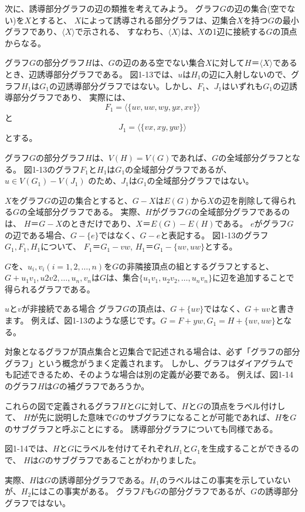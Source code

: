 
次に、誘導部分グラフの辺の類推を考えてみよう。
グラフ$G$の辺の集合(空でない)を$X$とすると、
$X$によって誘導される部分グラフは、辺集合$X$を持つ$G$の最小グラフであり、$\langle X\rangle $で示される、
すなわち、$\langle X\rangle $は、$X$の1辺に接続する$G$の頂点からなる。

グラフ$G$の部分グラフ$H$は、$G$の辺のある空でない集合$X$に対して$H＝\langle X\rangle $であるとき、辺誘導部分グラフである。
図1-13では、$u$は$H_1$の辺に入射しないので、グラフ$H_1$は$G_1$の辺誘導部分グラフではない。しかし、$F_1$、$J_1$はいずれも$G_1$の辺誘導部分グラフであり、
実際には、
$$F_1 = \langle \{uv, uw, wy, yx, xv\}\rangle $$
と
$$J_1 = \langle \{vx, xy, yw\} \rangle$$
とする。


グラフ$G$の部分グラフ$H$は、$V(H)=V(G)$であれば、$G$の全域部分グラフとなる。
図1-13のグラフ$F_1$と$H_1$は$G_1$の全域部分グラフであるが、
$u \in V(G_1) - V(J_1)$ のため、$J_1$は$G_1$の全域部分グラフではない。 

$X$をグラフ$G$の辺の集合とすると、$G - X$は$E(G)$から$X$の辺を削除して得られる$G$の全域部分グラフである。
実際、$H$がグラフ$G$の全域部分グラフであるのは、
$H＝G- X$のときだけであり、$X＝E(G)-E(H)$である。
$e$がグラフ$G$の辺である場合、$G-\{e\}$ではなく、$G-e$と表記する。
図1-13のグラフ$G_1, F_1, H_1$について、
$F_1＝G_1 - vw$, $H_1＝G_1 - \{uv, uw\}$とする。

$G$を、$u_i, v_i (i = 1,2,\ldots, n)$を$G$の非隣接頂点の組とするグラフとすると、
$G + {u_1v_1, u2v2, \ldots, u_n, v_n}$は$G$は、集合$\{u_1v_1, u_2v_2, \ldots, u_nv_n\}$に辺を追加することで得られるグラフである。

$u$と$v$が非接続である場合
グラフ$G$の頂点は、$G + \{uv\}$ではなく、$G + uv$と書きます。
例えば、図1-13のような感じです。$G=F+yw, G_1=H+\{uv, uw\}$となる。


対象となるグラフが頂点集合と辺集合で記述される場合は、必ず「グラフの部分グラフ」という概念がうまく定義されます。
しかし、グラフはダイアグラムでも記述できるため、そのような場合は別の定義が必要である。
例えば、図1-14のグラフ$H$は$G$の補グラフであろうか。

これらの図で定義されるグラフ$H$と$G$に対して、$H$と$G$の頂点をラベル付けして、
$H$が先に説明した意味で$G$のサブグラフになることが可能であれば、$H$を$G$のサブグラフと呼ぶことにする。
誘導部分グラフについても同様である。

図1-14では、$H$と$G$にラベルを付けてそれぞれ$H_1$と$G_1$を生成することができるので、
$H$は$G$のサブグラフであることがわかりました。

実際、$H$は$G$の誘導部分グラフである。$H_1$のラベルはこの事実を示していないが、$H_2$にはこの事実がある。
グラフ$F$も$G$の部分グラフであるが、$G$の誘導部分グラフではない。